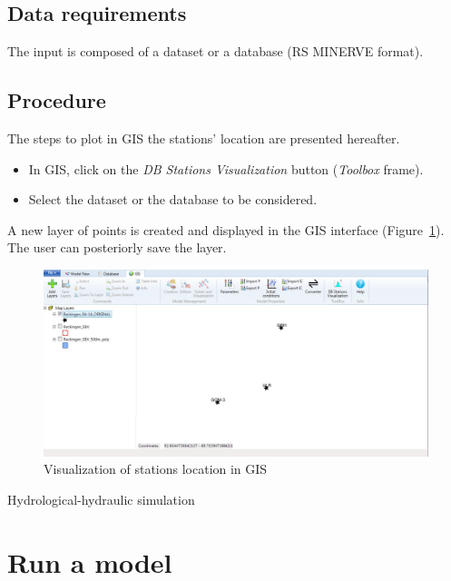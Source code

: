 \documentclass[
  letterpaper,
  DIV=11,
  numbers=noendperiod]{scrreprt}
\begin{document}
\hypertarget{data-requirements}{%
\section{Data requirements}\label{data-requirements}}

The input is composed of a dataset or a database (RS MINERVE format).

\hypertarget{procedure}{%
\section{Procedure}\label{procedure}}

The steps to plot in GIS the stations' location are presented hereafter.

\begin{itemize}
\item
  {In GIS, click on the \emph{DB Stations Visualization} button
  (\emph{Toolbox} frame).}
\item
  {Select the dataset or the database to be considered.}
\end{itemize}

A new layer of points is created and displayed in the GIS interface
(Figure~\ref{fig-gis_visualization_stations_location}). The user can
posteriorly save the layer.

\begin{figure}

{\centering \includegraphics{./figures/fig-gis_visualization_stations_location.png}

}

\caption{\label{fig-gis_visualization_stations_location}Visualization of
stations location in GIS}

\end{figure}

Hydrological-hydraulic simulation

\hypertarget{sec-user_hydro_hydrau_simulation_run_model}{%
\chapter{Run a model}\label{sec-user_hydro_hydrau_simulation_run_model}}
\end{document}
